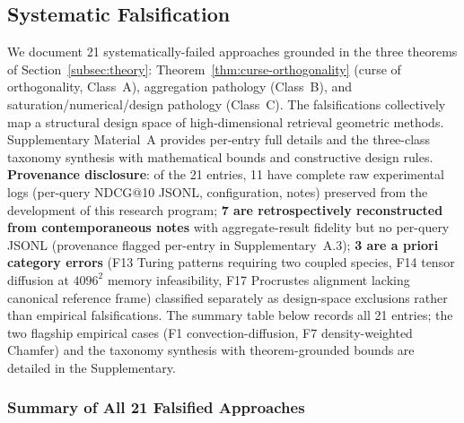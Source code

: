 \documentclass[review,1p]{elsarticle}
\begin{document}
\subsection{Systematic Falsification}
\label{subsec:falsification}

We document 21 systematically-failed approaches grounded in the three theorems of Section~\ref{subsec:theory}: Theorem~\ref{thm:curse-orthogonality} (curse of orthogonality, Class~A), aggregation pathology (Class~B), and saturation/numerical/design pathology (Class~C). The falsifications collectively map a structural design space of high-dimensional retrieval geometric methods. Supplementary Material~A provides per-entry full details and the three-class taxonomy synthesis with mathematical bounds and constructive design rules. \textbf{Provenance disclosure}: of the 21 entries, 11 have complete raw experimental logs (per-query NDCG@10 JSONL, configuration, notes) preserved from the development of this research program; \textbf{7 are retrospectively reconstructed from contemporaneous notes} with aggregate-result fidelity but no per-query JSONL (provenance flagged per-entry in Supplementary~A.3); \textbf{3 are a priori category errors} (F13 Turing patterns requiring two coupled species, F14 tensor diffusion at $4096^2$ memory infeasibility, F17 Procrustes alignment lacking canonical reference frame) classified separately as design-space exclusions rather than empirical falsifications. The summary table below records all 21 entries; the two flagship empirical cases (F1 convection-diffusion, F7 density-weighted Chamfer) and the taxonomy synthesis with theorem-grounded bounds are detailed in the Supplementary.

\subsubsection*{Summary of All 21 Falsified Approaches}
\end{document}
